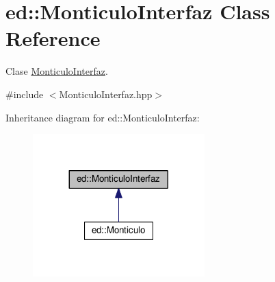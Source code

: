 \hypertarget{classed_1_1MonticuloInterfaz}{}\section{ed\+:\+:Monticulo\+Interfaz Class Reference}
\label{classed_1_1MonticuloInterfaz}


Clase \hyperlink{classed_1_1MonticuloInterfaz}{Monticulo\+Interfaz}.  




{\ttfamily \#include $<$Monticulo\+Interfaz.\+hpp$>$}



Inheritance diagram for ed\+:\+:Monticulo\+Interfaz\+:\nopagebreak
\begin{figure}[H]
\begin{center}
\leavevmode
\includegraphics[width=188pt]{classed_1_1MonticuloInterfaz__inherit__graph}
\end{center}
\end{figure}
